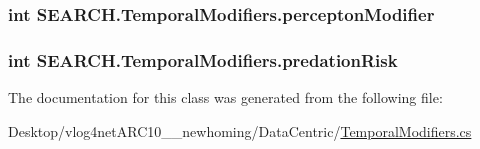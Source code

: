 \hypertarget{class_s_e_a_r_c_h_1_1_temporal_modifiers_afb6549fda216fb9ad82f311e4db2813e}{
\subsubsection[{percepton\-Modifier}]{\setlength{\rightskip}{0pt plus 5cm}int S\-E\-A\-R\-C\-H.\-Temporal\-Modifiers.\-percepton\-Modifier}}\label{class_s_e_a_r_c_h_1_1_temporal_modifiers_afb6549fda216fb9ad82f311e4db2813e}
\hypertarget{class_s_e_a_r_c_h_1_1_temporal_modifiers_a28bc2a746df06ddf74ac9cc5946564fc}{
\subsubsection[{predation\-Risk}]{\setlength{\rightskip}{0pt plus 5cm}int S\-E\-A\-R\-C\-H.\-Temporal\-Modifiers.\-predation\-Risk}}\label{class_s_e_a_r_c_h_1_1_temporal_modifiers_a28bc2a746df06ddf74ac9cc5946564fc}


The documentation for this class was generated from the following file\-:\begin{DoxyCompactItemize}
\item 
Desktop/vlog4net\-A\-R\-C10\-\_\-\_\-newhoming/\-Data\-Centric/\hyperlink{_temporal_modifiers_8cs}{Temporal\-Modifiers.\-cs}\end{DoxyCompactItemize}
